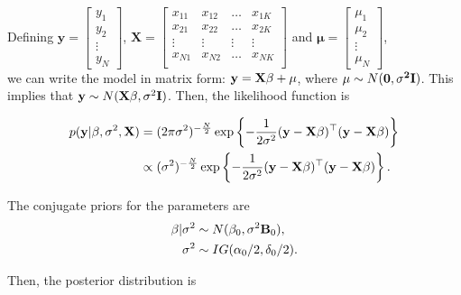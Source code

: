 Defining $\mathbf{y}=\begin{bmatrix} y_1\\ y_2\\ \vdots \\ y_N \end{bmatrix}$, $\mathbf{X}=\begin{bmatrix} x_{11} & x_{12} & \ldots & x_{1K}\\ x_{21} & x_{22} & \ldots & x_{2K}\\ \vdots & \vdots & \vdots & \vdots\\ x_{N1} & x_{N2} & \ldots & x_{NK}\\ \end{bmatrix}$ and $\mathbf{\mu}=\begin{bmatrix} \mu_1\\ \mu_2\\ \vdots \\ \mu_N \end{bmatrix}$,\\

we can write the model in matrix form: ${\bf{y}}={\bf{X}}\beta+\mu$, where $\mu\sim N(\bf{0},\sigma^2{\bf{I}})$. This implies that ${\bf{y}}\sim N({\bf{X}}\beta,\sigma^2\bf{I})$. Then, the likelihood function is

\begin{align*}
	p({\bf{y}}|\beta, \sigma^2, {{\bf{X}}}) & = (2\pi\sigma^2)^{-\frac{N}{2}} \exp \left\{-\frac{1}{2\sigma^2} ({\bf{y}} - {\bf{X}}\beta)^{\top}({\bf{y}} - {\bf{X}}\beta) \right\}  \\
	& \propto (\sigma^2)^{-\frac{N}{2}} \exp \left\{-\frac{1}{2\sigma^2} ({\bf{y}} - {\bf{X}}\beta)^{\top}({\bf{y}} - {\bf{X}}\beta) \right\}.
\end{align*}

The conjugate priors for the parameters are
\begin{align*}
	\beta|\sigma^2 & \sim N(\beta_0, \sigma^2 {\bf{B}}_0),\\
	\sigma^2 & \sim IG(\alpha_0/2, \delta_0/2).
\end{align*}

Then, the posterior distribution is

